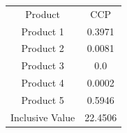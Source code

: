 \begin{tabular}{cc}
Product & CCP \\
Product 1 & 0.3971 \\
Product 2 & 0.0081 \\
Product 3 & 0.0 \\
Product 4 & 0.0002 \\
Product 5 & 0.5946 \\
Inclusive Value & 22.4506 \\
\end{tabular}
